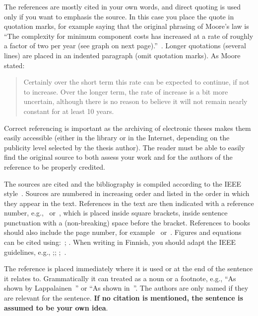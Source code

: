 The references are mostly cited in your own words, and direct quoting is used only if you want to emphasis the source. In this case you place the quote in quotation marks, for example saying that the original phrasing of Moore’s law is  ``The complexity for minimum component costs has increased at a rate of roughly a factor of two per year (see graph on next page).''~\cite{moore}. Longer
quotations (several lines) are placed in an indented paragraph (omit quotation marks). As Moore stated:
\begin{quote}
Certainly over the short term this rate can be expected to continue, if not to increase. Over the longer term, the rate of increase is a bit more uncertain, although there is no reason to believe it will not remain nearly constant for at least 10 years.~\cite{moore}
\end{quote}
Correct referencing is important as the archiving of electronic theses makes them easily accessible (either in the library or in the Internet, depending on the publicity level selected by the thesis author). The reader must be able
to easily find the original source to both assess your work and for the
authors of the reference to be properly credited.

The sources are cited and the bibliography is compiled according to
the IEEE style~\cite{ieeetransactions}.  Sources are numbered in
increasing order and listed in the order in which they appear in the
text.  References in the text are then indicated with a reference
number, e.g.,~\cite{lappalainen} or~\cite{lappalainen, acta, korpela},
which is placed inside square brackets, inside sentence punctuation
with a (non-breaking) space before the bracket. References to books
should also include the page number, for
example~\cite[p.~15]{lappalainen} or~\cite[pp.~15--17]{lappalainen}.
Figures and equations can be cited using:~\cite[Fig.~3]{lappalainen};
\cite[eq.~(3)]{lappalainen}. When writing in Finnish, you should adapt the IEEE guidelines, e.g., \cite[s.~15]{lappalainen};\cite[s.~15--17]{lappalainen};
\cite[Kuva~3]{lappalainen};~\cite[Yhtälö~(3)]{lappalainen}.

The reference is placed immediately where it is used or at the end of
the sentence it relates to. Grammatically it can treated as a noun or
a footnote, e.g., ``As shown by Lappalainen~\cite{lappalainen}'' or
``As shown in~\cite{lappalainen}''. The authors are only named if they
are relevant for the sentence. \textbf{If no citation is mentioned,
the sentence is assumed to be your own idea}.

